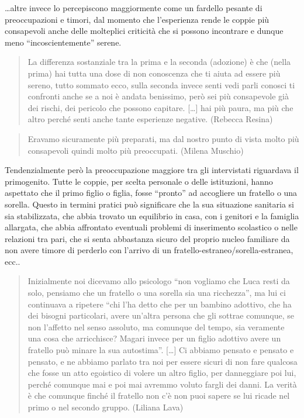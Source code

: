 \documentclass[12pt,oneside,svgnames]{memoir}
\newenvironment{quotationb}%
{\color{maincolor}\begin{leftbar}\begin{quotation}}%
{\end{quotation}\end{leftbar}\ignorespacesafterend}
\begin{document}
\ldots{}altre invece lo percepiscono maggiormente come un fardello
pesante di preoccupazioni e timori, dal momento che l'esperienza rende
le coppie più consapevoli anche delle molteplici criticità che si
possono incontrare e dunque meno ``incoscientemente'' serene.

\begin{quotationb}
La differenza sostanziale tra la prima e la seconda (adozione) è che
(nella prima) hai tutta una dose di non conoscenza che ti aiuta ad
essere più sereno, tutto sommato ecco, sulla seconda invece senti vedi
parli conosci ti confronti anche se a noi è andata benissimo, però sei
più consapevole già dei rischi, dei pericolo che possono capitare.
{[}\ldots{}{]} hai più paura, ma più che altro perché senti anche tante
esperienze negative. (Rebecca Resina)
\end{quotationb}

\begin{quotationb}
Eravamo sicuramente più preparati, ma dal nostro punto di vista molto
più consapevoli quindi molto più preoccupati. (Milena Muschio)
\end{quotationb}

Tendenzialmente però la preoccupazione maggiore tra gli intervistati
riguardava il primogenito. Tutte le coppie, per scelta personale o delle
istituzioni, hanno aspettato che il primo figlio o figlia, fosse
``pronto'' ad accogliere un fratello o una sorella. Questo in termini
pratici può significare che la sua situazione sanitaria si sia
stabilizzata, che abbia trovato un equilibrio in casa, con i genitori e
la famiglia allargata, che abbia affrontato eventuali problemi di
inserimento scolastico o nelle relazioni tra pari, che si senta
abbastanza sicuro del proprio nucleo familiare da non avere timore di
perderlo con l'arrivo di un fratello-estraneo/sorella-estranea, ecc..

\begin{quotationb}
Inizialmente noi dicevamo allo psicologo ``non vogliamo che Luca resti
da solo, pensiamo che un fratello o una sorella sia una ricchezza'', ma
lui ci continuava a ripetere ``chi l'ha detto che per un bambino
adottivo, che ha dei bisogni particolari, avere un'altra persona che gli
sottrae comunque, se non l'affetto nel senso assoluto, ma comunque del
tempo, sia veramente una cosa che arricchisce? Magari invece per un
figlio adottivo avere un fratello può minare la sua autostima''.
{[}\ldots{}{]} Ci abbiamo pensato e pensato e pensato, e ne abbiamo
parlato tra noi per essere sicuri di non fare qualcosa che fosse un atto
egoistico di volere un altro figlio, per danneggiare poi lui, perché
comunque mai e poi mai avremmo voluto fargli dei danni. La verità è che
comunque finché il fratello non c'è non puoi sapere se lui ricade nel
primo o nel secondo gruppo. (Liliana Lava)
\end{quotationb}
\end{document}
